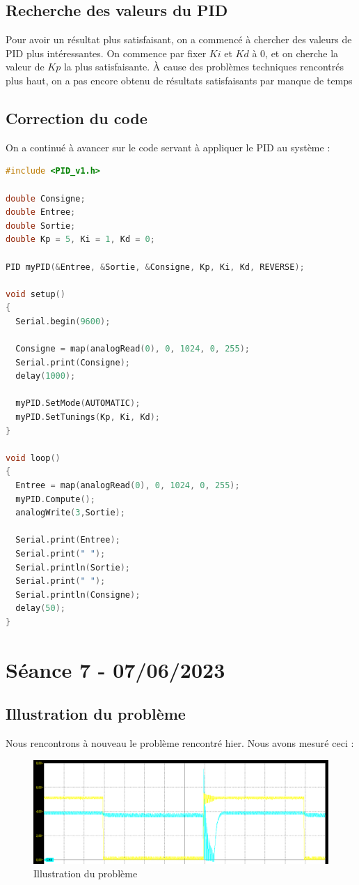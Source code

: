 \documentclass[11pt,a4paper]{article}
\begin{document}
\subsection{Recherche des valeurs du PID}
Pour avoir un résultat plus satisfaisant, on a commencé à chercher des valeurs de PID plus intéressantes. On commence par fixer $Ki$ et $Kd$ à 0, et on cherche la valeur de $Kp$ la plus satisfaisante. À cause des problèmes techniques rencontrés plus haut, on a pas encore obtenu de résultats satisfaisants par manque de temps

\subsection{Correction du code}
On a continué à avancer sur le code servant à appliquer le PID au système :
\begin{lstlisting}[language = C]
#include <PID_v1.h>

double Consigne;
double Entree;
double Sortie;
double Kp = 5, Ki = 1, Kd = 0;

PID myPID(&Entree, &Sortie, &Consigne, Kp, Ki, Kd, REVERSE);

void setup()
{
  Serial.begin(9600);

  Consigne = map(analogRead(0), 0, 1024, 0, 255);
  Serial.print(Consigne);
  delay(1000);

  myPID.SetMode(AUTOMATIC);
  myPID.SetTunings(Kp, Ki, Kd);  
}

void loop()
{
  Entree = map(analogRead(0), 0, 1024, 0, 255);
  myPID.Compute();
  analogWrite(3,Sortie);

  Serial.print(Entree);
  Serial.print(" ");
  Serial.println(Sortie);
  Serial.print(" ");  
  Serial.println(Consigne);
  delay(50);
}
\end{lstlisting}

\section{Séance 7 - 07/06/2023}
\subsection{Illustration du problème}
Nous rencontrons à nouveau le problème rencontré hier. Nous avons mesuré ceci :
\begin{figure} [H]
\begin{center}
\includegraphics[width=1\textwidth]{Schémas/Pb entrée sortie.png} 
\end{center}
\caption{Illustration du problème}
\end{figure}
\end{document}
